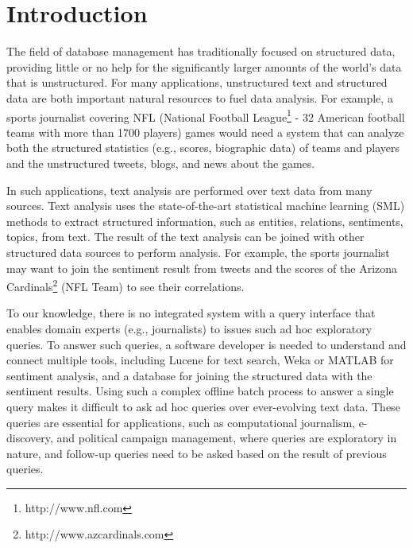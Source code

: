 
\section{Introduction}

The field of database management has traditionally focused on
structured data, providing little or no help for the significantly
larger amounts of the world's data that is unstructured. For many
applications, unstructured text and structured data are both
important natural resources to fuel data analysis. For example, a
sports journalist covering NFL (National Football
League\footnote{http://www.nfl.com} - 32 American football teams with
more than 1700 players) games would need a system that can analyze both the
structured statistics (e.g., scores, biographic data) of teams and players and the
unstructured tweets, blogs, and news about the games.

In such applications, text analysis are performed over text data
from many sources. Text analysis uses the state-of-the-art
statistical machine learning (SML) methods to extract structured
information, such as entities, relations, sentiments, topics, from
text. The result of the text analysis can be joined with other
structured data sources to perform analysis. For example, the sports
journalist may want to join the sentiment result from tweets and the
scores of the Arizona Cardinals\footnote{http://www.azcardinals.com} 
(NFL Team) to see their correlations.

To our knowledge, there is no integrated system with a query
interface that enables domain experts (e.g., journalists) to issues
such ad hoc exploratory queries. To answer such queries, a software
developer is needed to understand and connect multiple tools,
including Lucene for text search, Weka or MATLAB for sentiment
analysis, and a database for joining the structured data with the
sentiment results. Using such a complex offline batch process to 
answer a single query
makes it difficult to ask ad hoc queries over ever-evolving text data. 
These queries are essential for applications, such as computational journalism,
e-discovery, and political campaign management, where queries are
exploratory in nature, and follow-up queries need to be asked based
on the result of previous queries.


